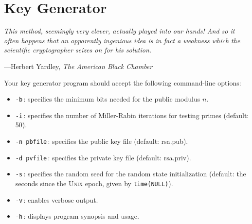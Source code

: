 \section{Key Generator}
\epigraph{\emph{This method, seemingly very clever, actually played into our hands! And so it often happens that an apparently ingenious idea is in fact a weakness which the scientific cryptographer seizes on for his solution.}}{---Herbert Yardley, \emph{The American Black Chamber}}

\noindent
Your key generator program should accept the following command-line
options:
\begin{itemize}
  \item \texttt{-b}\,: specifies the minimum bits needed for the public
    modulus $n$.
  \item \texttt{-i}\,: specifies the number of Miller-Rabin iterations
    for testing primes (default: 50).
  \item \texttt{-n pbfile}\,: specifies the public key file (default:
    rsa.pub).
  \item \texttt{-d pvfile}\,: specifies the private key file (default:
    rsa.priv).
  \item \texttt{-s}\,: specifies the random seed for the random state
    initialization (default: the seconds since the \textsc{Unix} epoch,
    given by \texttt{time(NULL)}).
  \item \texttt{-v}\,: enables verbose output.
  \item \texttt{-h}\,: displays program synopsis and usage.
\end{itemize}

